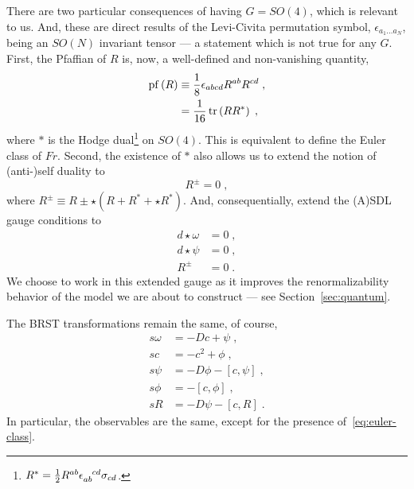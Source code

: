 \documentclass[../main.tex]{subfiles}
\begin{document}
There are two particular consequences of having $G=SO(4)$, which is relevant to us. And, these are direct results of the Levi-Civita permutation symbol, $ \epsilon_{a_1 \ldots a_N} $, being an $ SO(N) $ invariant tensor --- a statement which is not true for any $G$. First, the Pfaffian of $R$ is, now, a well-defined and non-vanishing quantity,
\begin{subequations}%
  \label{eq:euler-class}
  \begin{align}
    \operatorname{pf} \left( R \right) & \equiv \frac{ 1 }{ 8 } \epsilon_{abcd} R^{ab}R^{cd} \;, \\
                         & =\frac{ 1 }{ 16 } \operatorname{tr} \left( RR^* \right) \;,
  \end{align}
\end{subequations}
where $*$ is the Hodge dual\footnote{ $ R^* = \frac{ 1 }{ 2 } R^{ab}\tensor{ \epsilon }{_{ab}^{cd}} \sigma_{cd} $. } on $SO(4)$. This is equivalent to define the Euler class of $ Fr $. Second, the existence of $*$ also allows us to extend the notion of (anti-){}self duality to
\begin{equation}
  \label{eq:extended-self-duality}
  R^{ \pm } = 0  \;,
\end{equation}
where $ R^{ \pm } \equiv R \pm \star \left( R + R^{ * } + \star R^{ * } \right) $. And, consequentially, extend the (A){}SDL gauge conditions to
\begin{subequations}%
  \label{eq:extended-asdlg}
  \begin{align}
    d \star \omega & = 0 \;, \\
    d \star \psi   & = 0 \;, \\
    R^{ \pm }      & =0 \;.
  \end{align}
\end{subequations}
We choose to work in this extended gauge as it improves the renormalizability behavior of the model we are about to construct --- see Section~\ref{sec:quantum}.

The BRST transformations remain the same, of course,
\begin{subequations}%
  \label{eq:top_grav_brst}
  \begin{align}
    s\omega & = -Dc + \psi \;,                      \\
    sc      & = - c^2 + \phi \;,                    \\
    s\psi   & = -D\phi - \left[ c, \psi \right] \;, \\
    s\phi   & = - \left[ c, \phi \right]\;,         \\
    sR      & = -D\psi - \left[ c, R \right] \;.
  \end{align}
\end{subequations}
In particular, the observables are the same, except for the presence of~\eqref{eq:euler-class}.
\end{document}
